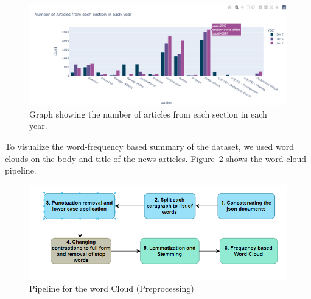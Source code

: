 \documentclass[sigconf,authorversion,nonacm]{acmart}
\begin{document}
\begin{figure}[h]
    \centering
    \includegraphics[width=\linewidth]{img/year.png}
    \caption{Graph showing the number of articles from each section in each year.}
    \label{fig:graph}
\end{figure}

To visualize the word-frequency based summary of the dataset, we used word clouds on the body and title of the news articles. Figure~\ref{fig:cloud} shows the word cloud pipeline.

\begin{figure}[h]
    \centering
    \includegraphics[width=\linewidth]{img/cloudpipeline.png}
    \caption{Pipeline for the word Cloud (Preprocessing)}
    \label{fig:cloud}
\end{figure}
\end{document}
